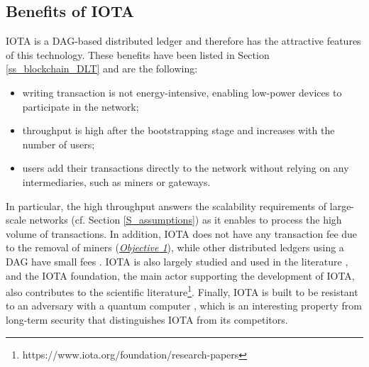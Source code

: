  \subsection{Benefits of IOTA}
\label{ss_benefits_iota}
 IOTA is a DAG-based distributed ledger and therefore has the attractive features of this technology. These benefits have been listed in Section \ref{ss_blockchain_DLT} and are the following:

 \begin{itemize}
  \item writing transaction is not energy-intensive, enabling low-power devices to participate in the network;
  \item throughput is high after the bootstrapping stage and increases with the number of users;
  \item users add their transactions directly to the network without relying on any intermediaries, such as miners or gateways.
\end{itemize}

In particular, the high throughput answers the scalability requirements of large-scale networks (cf. Section \ref{S_assumptions}) as it enables to process the high volume of transactions. In addition, IOTA does not have any transaction fee due to the removal of miners (\hyperref[obj:1]{\emph{Objective 1}}), while other distributed ledgers using a DAG have small fees \cite{Churyumov2017, LeMahieu2017}. IOTA is also largely studied and used in the literature \cite{Alshaikhli2022, Conti2022, Guo2023, Alsadi2023}, and the IOTA foundation, the main actor supporting the development of IOTA, also contributes to the scientific literature\footnote{https://www.iota.org/foundation/research-papers}. Finally, IOTA is built to be resistant to an adversary with a quantum computer \cite{Popov2017}, which is an interesting property from long-term security that distinguishes IOTA from its competitors.


